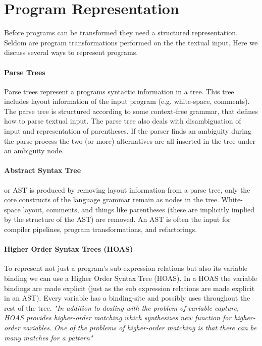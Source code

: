 \section{Program Representation} \label{program-representation}
Before programs can be transformed they need a structured representation. Seldom are program transformations performed on the the textual input. Here we discuss several ways to represent programs.

\paragraph{Parse Trees} 
Parse trees represent a programs syntactic information in a tree. This tree includes layout information of the input program (e.g. white-space, comments). The parse tree is structured according to some context-free grammar, that defines how to parse textual input. The parse tree also deals with disambiguation of input and representation of parentheses. If the parser finds an ambiguity during the parse process the two (or more) alternatives are all inserted in the tree under an ambiguity node.

\paragraph{Abstract Syntax Tree}
or AST is produced by removing layout information from a parse tree, only the core constructs of the language grammar remain as nodes in the tree. White-space layout, comments, and things like parentheses (these are implicitly implied by the structure of the AST) are removed. An AST is often the input for compiler pipelines, program transformations, and refactorings.

\paragraph{Higher Order Syntax Trees (HOAS)}
To represent not just a program's sub expression relations but also its variable binding we can use a Higher Order Syntax Tree (HOAS)\cite{Pfenning1988}. In a HOAS the variable bindings are made explicit (just as the sub expression relations are made explicit in an AST). Every variable has a binding-site and possibly uses throughout the rest of the tree. \textit{"In addition to dealing with the problem of variable capture, HOAS provides higher-order matching which synthesizes new function for higher-order  variables. One of the problems of higher-order matching is that there can be many matches for a pattern"}~\cite{Visser2001}

